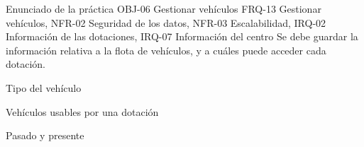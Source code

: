 {\reportauthors}
{Enunciado de la práctica}
{OBJ-06 Gestionar vehículos}
{FRQ-13 Gestionar vehículos, NFR-02 Seguridad de los datos, NFR-03 Escalabilidad, IRQ-02 Información de las dotaciones, IRQ-07 Información del centro}
{Se debe guardar la información relativa a la flota de vehículos, y a cuáles puede acceder cada dotación.}
{
\item{Tipo del vehículo}
\item{Vehículos usables por una dotación}
}
{Pasado y presente}

